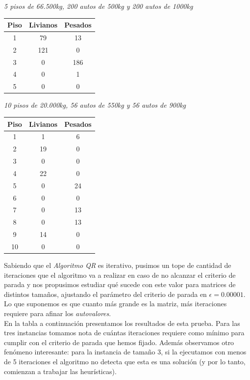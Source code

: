 \documentclass[a4paper]{article}
\begin{document}
\vspace{2em}
\textit{5 pisos de 66.500kg, 200 autos de 500kg y 200 autos de 1000kg}
\begin{center}
\begin{tabular}{|c|c|c|}
  \hline
  Piso & Livianos & Pesados \\
  \hline
1   & 79   & 13   \\
2   & 121 & 0     \\
3   & 0     & 186 \\
4   & 0     & 1     \\
5   & 0     & 0     \\
\hline
\end{tabular}
\end{center}

\vspace{2em}
\textit{10 pisos de 20.000kg, 56 autos de 550kg y 56 autos de 900kg}
\begin{center}
\begin{tabular}{|c|c|c|}
  \hline
  Piso & Livianos & Pesados \\
  \hline
1   & 1   & 6   \\
2   & 19 & 0   \\
3   & 0   & 0   \\
4   & 22 & 0   \\
5   & 0   & 24 \\
6   & 0   & 0   \\
7   & 0   & 13 \\
8   & 0   & 13 \\
9   & 14 & 0   \\
10  & 0  & 0   \\
\hline
\end{tabular}
\end{center}

Sabiendo que el \textit{Algoritmo QR} es iterativo, pusimos un tope de cantidad de iteraciones que el algoritmo va a realizar en caso de no alcanzar el criterio de parada y nos propusimos estudiar qué sucede con este valor para matrices de distintos tamaños, ajustando el parámetro del criterio de parada en $\epsilon = 0.00001$. Lo que suponemos es que cuanto más grande es la matriz, más iteraciones requiere para afinar los \textit{autovalores}.\\

En la tabla a continuación presentamos los resultados de esta prueba. Para las tres instancias tomamos nota de cuántas iteraciones requiere como mínimo para cumplir con el criterio de parada que hemos fijado. Además observamos otro fenómeno interesante: para la instancia de tamaño 3, si la ejecutamos con menos de 5 iteraciones el algoritmo no detecta que esta es una solución (y por lo tanto, comienzan a trabajar las heurísticas). 
\end{document}

